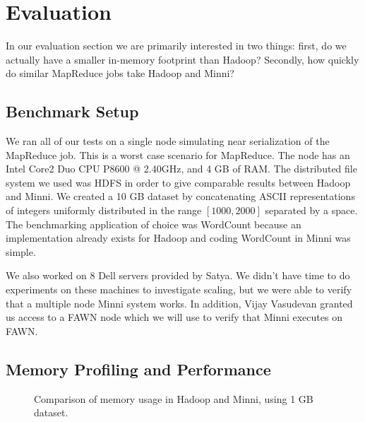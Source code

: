 \documentclass[10pt,letter,final,article,twocolumn]{article} %
\begin{document}
\section{Evaluation}
In our evaluation section we are primarily interested in two things: first, do we actually have a smaller in-memory footprint than Hadoop? Secondly, how quickly do similar MapReduce jobs take Hadoop and Minni?

\subsection{Benchmark Setup}
We ran all of our tests on a single node simulating near serialization of the 
MapReduce job.  This is a worst case scenario for MapReduce.  The node has an Intel Core2 Duo CPU P8600 @ 2.40GHz,
and 4 GB of RAM.  The distributed file system we used was HDFS in order to give comparable results between Hadoop
and Minni.  We created a 10 GB dataset by concatenating ASCII representations of integers uniformly distributed in the
range $[1000,2000]$ separated by a space.  The benchmarking application of choice was WordCount because an implementation
already exists for Hadoop and coding WordCount in Minni was simple.

We also worked on $8$ Dell servers provided by Satya.  We didn't have time to do experiments on these machines to investigate
scaling, but we were able to verify that a multiple node Minni system works.  In addition, Vijay Vasudevan granted us access to a 
FAWN node which we will use to verify that Minni executes on FAWN.

\subsection{Memory Profiling and Performance}

\begin{figure}
\centering
{}
\caption{Comparison of memory usage in Hadoop and Minni, using 1 GB dataset.}
\label{fig:memory}
\end{figure}
\end{document}
